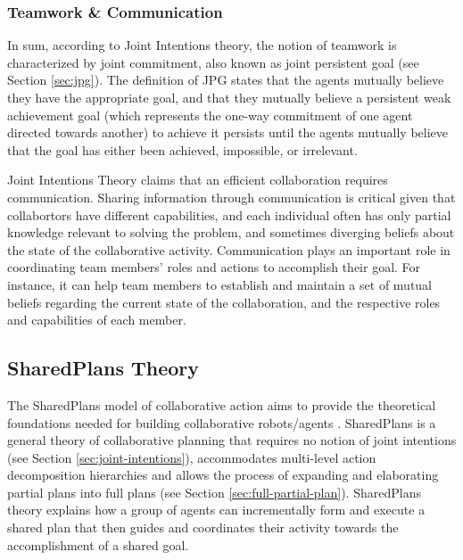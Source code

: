\documentclass[11pt]{article}
\begin{document}
\subsubsection{Teamwork \& Communication}

In sum, according to Joint Intentions theory, the notion of teamwork is
characterized by joint commitment, also known as joint persistent goal (see
Section \ref{sec:jpg}). The definition of JPG states that the agents mutually
believe they have the appropriate goal, and that they mutually believe a
persistent weak achievement goal (which represents the one-way commitment of one
agent directed towards another) to achieve it persists until the agents mutually
believe that the goal has either been achieved, impossible, or irrelevant.

Joint Intentions Theory claims that an efficient collaboration requires
communication. Sharing information through communication is critical given that
collabortors have different capabilities, and each individual often has only
partial knowledge relevant to solving the problem, and sometimes diverging
beliefs about the state of the collaborative activity. Communication plays an
important role in coordinating team members' roles and actions to accomplish
their goal. For instance, it can help team members to establish and maintain a
set of mutual beliefs regarding the current state of the collaboration, and the
respective roles and capabilities of each member.

\subsection{SharedPlans Theory}
\label{sec:sharedplans}

The SharedPlans model of collaborative action \cite{grosz:planning-acting,
grosz:collaboration, grosz:plans-discourse} aims to provide the theoretical
foundations needed for building collaborative robots/agents
\cite{grosz:collaborative-systems}. SharedPlans is a general theory of
collaborative planning that requires no notion of joint intentions (see
Section \ref{sec:joint-intentions}), accommodates multi-level action
decomposition hierarchies and allows the process of expanding and elaborating
partial plans into full plans (see Section \ref{sec:full-partial-plan}).
SharedPlans theory explains how a group of agents can incrementally form and
execute a shared plan that then guides and coordinates their activity towards
the accomplishment of a shared goal.
\end{document}

